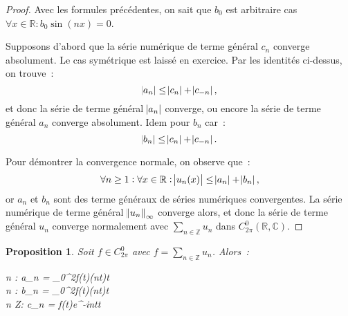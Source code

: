 \documentclass{report}
\newtheorem{prp}[thm]{Proposition}
\theoremstyle{definition}
\theoremstyle{remark}
\numberwithin{equation}{section}
\newcommand{\C}{\mathbb C}
\newcommand{\R}{\mathbb R}
\newcommand{\Z}{\mathbb Z}
\begin{document}
			\begin{proof} Avec les formules précédentes, on sait que $b_0$ est arbitraire cas $\forall x \in \R : b_0\sin(nx) = 0$.

			Supposons d'abord que la série numérique de terme général $c_n$ converge absolument. Le cas symétrique est laissé en exercice. Par les identités
			ci-dessus, on trouve~:
			\begin{equation}
				\abs {a_n} \leq \abs {c_n} + \abs {c_{-n}},
			\end{equation}
			et donc la série de terme général $\abs {a_n}$ converge, ou encore la série de terme général $a_n$ converge absolument. Idem pour $b_n$ car~:
			\begin{equation}
				\abs {b_n} \leq \abs {c_n} + \abs {c_{-n}}.
			\end{equation}

			Pour démontrer la convergence normale, on observe que~:
			\begin{equation}
				\forall n \geq 1 : \forall x \in \R : \abs {u_n(x)} \leq \abs {a_n} + \abs {b_n},
			\end{equation}
			or $a_n$ et $b_n$ sont des terme généraux de séries numériques convergentes. La série numérique de terme général $\norm {u_n}_\infty$ converge alors, et
			donc la série de terme général $u_n$ converge normalement avec $\sum_{n \in \Z}u_n$ dans $C^0_{2\pi}(\R, \C)$.
			\end{proof}

			\begin{prp} Soit $f \in C^0_{2\pi}$ avec $f = \sum_{n \in \Z}u_n$. Alors~:
			\begin{subnumcases}{}
				\forall n  : a_n = \pi \int_0^{2\pi}f(t)\cos(nt)\dif t \\
				\forall n  : b_n = \pi \int_0^{2\pi}f(t)\sin(nt)\dif t \\
				\forall n \in \Z : c_n = f(t)e^{-int}\dif t\label{eq:Fourier c_n}
			\end{subnumcases}
			\end{prp}
\end{document}
